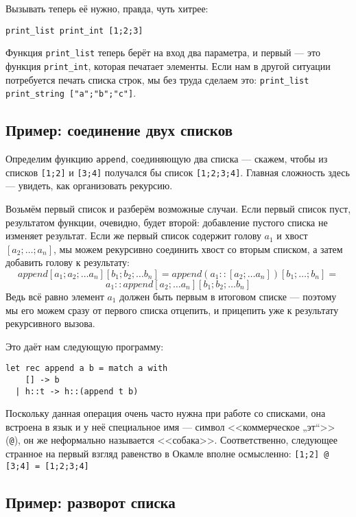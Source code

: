 Вызывать теперь её нужно, правда, чуть хитрее:

\begin{verbatim}
print_list print_int [1;2;3]
\end{verbatim}

Функция \verb!print_list! теперь берёт на вход два параметра, и первый --- это функция
\verb!print_int!, которая печатает элементы. Если нам в другой ситуации потребуется
печать списка строк, мы без труда сделаем это: \verb!print_list print_string ["a";"b";"c"]!.

\subsection{Пример: соединение двух списков}

Определим функцию \verb!append!, соединяющую два списка --- скажем, чтобы из списков 
\verb![1;2]! и \verb![3;4]! получался бы список \verb![1;2;3;4]!. Главная сложность здесь ---
увидеть, как организовать рекурсию.

Возьмём первый список и разберём возможные случаи. Если первый список пуст, 
результатом функции, очевидно, будет второй: добавление пустого списка не изменяет 
результат. Если же первый список содержит голову $a_1$ и хвост $[a_2; \dots; a_n]$, 
мы можем рекурсивно соединить хвост со вторым списком, а затем добавить голову 
к результату: 
$$append [a_1; a_2; \dots a_n] [b_1; b_2; \dots b_n] = append (a_1 :: [a_2; \dots a_n]) [b_1; \dots; b_n] = $$
$$a_1 :: append [a_2; \dots a_n] [b_1; b_2; \dots b_n]$$
Ведь всё равно элемент $a_1$ должен быть первым в итоговом списке --- поэтому
мы его можем сразу от первого списка отцепить, и прицепить уже к результату 
рекурсивного вызова.

Это даёт нам следующую программу:

\begin{verbatim}
let rec append a b = match a with
    [] -> b
  | h::t -> h::(append t b)
\end{verbatim}

Поскольку данная операция очень часто нужна при работе со списками, она
встроена в язык и у неё специальное имя --- символ <<коммерческое „эт“>>
(\verb!@!), он же неформально называется <<собака>>. 
Соответственно, следующее странное на первый взгляд равенство в Окамле 
вполне осмысленно: 
\verb![1;2] @ [3;4] = [1;2;3;4]!

\subsection{Пример: разворот списка}

